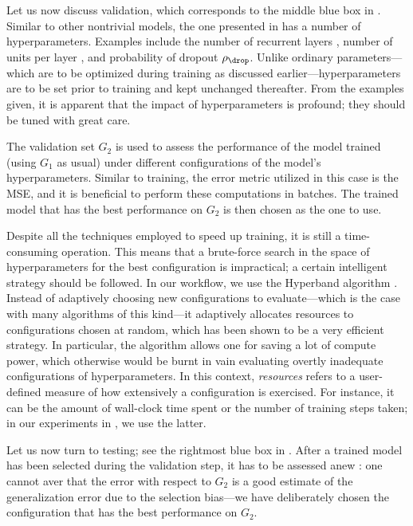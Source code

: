 Let us now discuss validation, which corresponds to the middle blue box in
. Similar to other nontrivial models, the one presented in
 has a number of hyperparameters. Examples include
the number of recurrent layers \nl, number of units per layer \nu, and
probability of dropout $\rho_\drop$. Unlike ordinary parameters---which are to
be optimized during training as discussed earlier---hyperparameters are to be
set prior to training and kept unchanged thereafter. From the examples given, it
is apparent that the impact of hyperparameters is profound; they should be tuned
with great care.

The validation set $G_2$ is used to assess the performance of the model trained
(using $G_1$ as usual) under different configurations of the model's
hyperparameters. Similar to training, the error metric utilized in this case is
the \ac{MSE}, and it is beneficial to perform these computations in batches. The
trained model that has the best performance on $G_2$ is then chosen as the one
to use.

Despite all the techniques employed to speed up training, it is still a
time-consuming operation. This means that a brute-force search in the space of
hyperparameters for the best configuration is impractical; a certain intelligent
strategy should be followed. In our workflow, we use the Hyperband algorithm
\cite{li2016}. Instead of adaptively choosing new configurations to
evaluate---which is the case with many algorithms of this kind---it adaptively
allocates resources to configurations chosen at random, which has been shown to
be a very efficient strategy. In particular, the algorithm allows one for saving
a lot of compute power, which otherwise would be burnt in vain evaluating
overtly inadequate configurations of hyperparameters. In this context,
\emph{resources} refers to a user-defined measure of how extensively a
configuration is exercised. For instance, it can be the amount of wall-clock
time spent or the number of training steps taken; in our experiments in
, we use the latter.

Let us now turn to testing; see the rightmost blue box in .
After a trained model has been selected during the validation step, it has to be
assessed anew \cite{hastie2013}: one cannot aver that the error with respect to
$G_2$ is a good estimate of the generalization error due to the selection
bias---we have deliberately chosen the configuration that has the best
performance on $G_2$.


